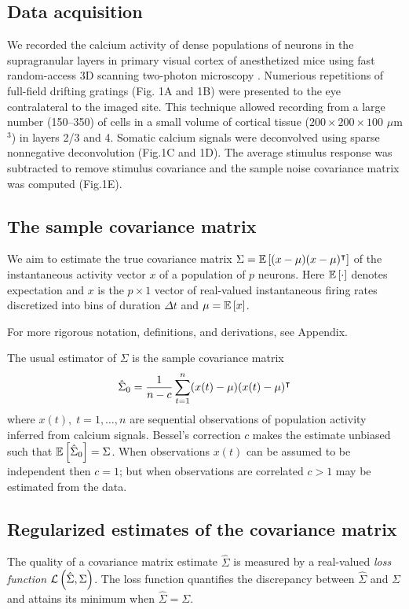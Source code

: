 \subsection*{Data acquisition}
We recorded the calcium activity  of dense populations of neurons in the supragranular layers in primary visual cortex of anesthetized mice using fast random-access 3D scanning two-photon microscopy \cite{Stosiek:2003,Reddy:2005}.  Numerious repetitions of full-field drifting gratings (Fig. 1A and 1B) were presented to the eye contralateral to the imaged site. This technique allowed recording from a large number (150--350) of cells in a small volume of cortical tissue ($200\times200\times100$ $\mu$m$^3$) in layers 2/3 and 4. Somatic calcium signals were deconvolved using  sparse nonnegative deconvolution \cite{Vogelstein:2010} (Fig.\;1C and 1D).  The average stimulus response was subtracted to remove stimulus covariance and the sample noise covariance matrix was computed (Fig.\;1E).



\subsection*{The sample covariance matrix}
We aim to estimate the true covariance matrix $\Sigma = \mathbb E\left[ (x-\mu)(x-\mu)^\intercal\right]$ of the instantaneous activity vector $x$ of a population of $p$ neurons. Here $\mathbb E\left[ \cdot\right]$ denotes expectation  and $x$ is the $p\times 1$ vector of real-valued instantaneous firing rates discretized into bins of duration $\Delta t$ and $\mu = \mathbb E\left[ x\right]$.  

For more rigorous notation, definitions, and derivations, see Appendix. 

The usual estimator of $\Sigma$ is the sample covariance matrix
\begin{equation}
\hat \Sigma_0 = \frac 1 {n-c} \sum\limits_{t=1}^n (x(t)-\mu)(x(t)-\mu)^\intercal 
\end{equation}
where $x(t),\;t=1,\ldots,n$ are sequential observations of population activity inferred from calcium signals. Bessel's correction $c$ makes the estimate unbiased such that $\mathbb E\left[ \hat\Sigma_0\right] = \Sigma$. When observations $x(t)$ can be assumed to be independent then $c=1$; but when observations are correlated $c>1$ may be estimated from the data. 

\subsection*{Regularized estimates of the covariance matrix}
The quality of a covariance matrix estimate $\hat\Sigma$ is measured by a real-valued \emph{loss function} $\mathcal L\left(\hat\Sigma,\Sigma\right)$.  The loss function quantifies the discrepancy between $\hat\Sigma$ and $\Sigma$ and attains its minimum  when $\hat\Sigma = \Sigma$. 

